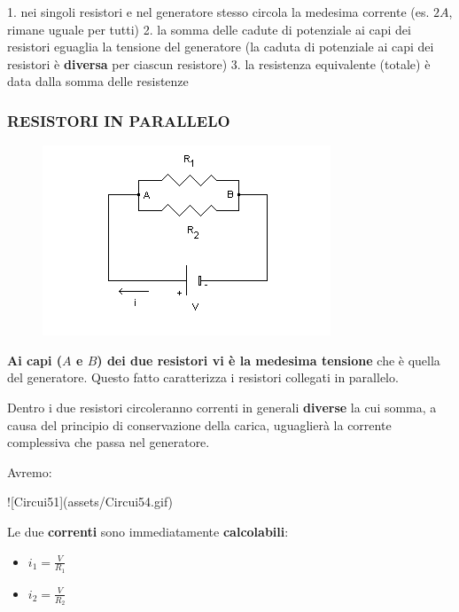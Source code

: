 \documentclass{article}
\begin{document}
  1. nei singoli resistori e nel generatore stesso circola la medesima corrente (es. $2A$, rimane uguale per tutti)
  2. la somma delle cadute di potenziale ai capi dei resistori eguaglia la tensione del generatore (la caduta di potenziale ai capi dei resistori è \textbf{diversa} per ciascun resistore)
  3. la resistenza equivalente (totale) è data dalla somma delle resistenze

\subsubsection{RESISTORI IN PARALLELO}

\begin{figure}
  \includegraphics[width=\linewidth]{parallelo.png}
\end{figure}

\textbf{Ai capi ($A$ e $B$) dei due resistori vi è la medesima tensione} che è quella del generatore. Questo fatto caratterizza i resistori collegati in parallelo.

Dentro i due resistori circoleranno correnti in generali \textbf{diverse} la cui somma, a causa del principio di conservazione della carica, uguaglierà la corrente complessiva che passa nel generatore.

Avremo: 

![Circui51](assets/Circui54.gif)

Le due \textbf{correnti} sono immediatamente \textbf{calcolabili}:
\begin{itemize}
  \item $i_1=\frac{V}{R_1}$
  \item $i_2=\frac{V}{R_2}$
\end{itemize}
\end{document}
